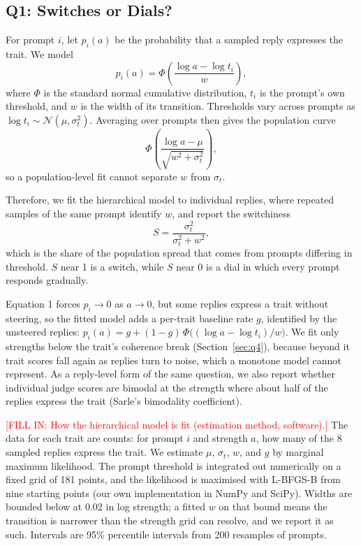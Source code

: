 \documentclass[11pt]{article}
\newcommand{\fillin}[1]{\textcolor{red}{[FILL IN: #1]}}
\newcommand{\upd}[1]{{\color{updgreen}#1}}
\begin{document}
\subsection{Q1: Switches or Dials?}
For prompt $i$, let $p_i(a)$ be the probability that a sampled reply expresses the
trait. We model
\begin{equation}
p_i(a) = \Phi\!\left(\frac{\log a - \log t_i}{w}\right),
\end{equation}
where $\Phi$ is the standard normal cumulative distribution, $t_i$ is the prompt's own
threshold, and $w$ is the width of its transition. Thresholds vary across prompts as
$\log t_i \sim \mathcal{N}(\mu, \sigma_t^2)$. Averaging over prompts then gives the
population curve
\begin{equation}
\Phi\!\left(\frac{\log a - \mu}{\sqrt{w^2 + \sigma_t^2}}\right),
\end{equation}
so a population-level fit cannot separate $w$ from $\sigma_t$.

Therefore, we fit the hierarchical model to individual replies, where repeated samples
of the same prompt identify $w$, and report the switchiness
\begin{equation}
S = \frac{\sigma_t^2}{\sigma_t^2 + w^2},
\end{equation}
which is the share of the population spread that comes from prompts differing in
threshold. $S$ near 1 is a switch, while $S$ near 0 is a dial in which every prompt
responds gradually.

\upd{Equation 1 forces $p_i \to 0$ as $a \to 0$, but some replies express a trait
without steering, so the fitted model adds a per-trait baseline rate $g$,
identified by the unsteered replies: $p_i(a) = g + (1-g)\,\Phi\big((\log a - \log
t_i)/w\big)$. We fit only strengths below the trait's coherence break
(Section~\ref{sec:q4}), because beyond it trait scores fall again as replies turn
to noise, which a monotone model cannot represent. As a reply-level form of the
same question, we also report whether individual judge scores are bimodal at the
strength where about half of the replies express the trait (Sarle's bimodality
coefficient).}

\fillin{How the hierarchical model is fit (estimation method, software).}
\upd{The data for each trait are counts: for prompt $i$ and strength $a$, how many
of the 8 sampled replies express the trait. We estimate $\mu$, $\sigma_t$, $w$,
and $g$ by marginal maximum likelihood. The prompt threshold is integrated out
numerically on a fixed grid of 181 points, and the likelihood is maximised with
L-BFGS-B from nine starting points (our own implementation in NumPy and SciPy).
Widths are bounded below at 0.02 in log strength; a fitted $w$ on that bound
means the transition is narrower than the strength grid can resolve, and we
report it as such. Intervals are 95\% percentile intervals from 200 resamples of
prompts.}
\end{document}
